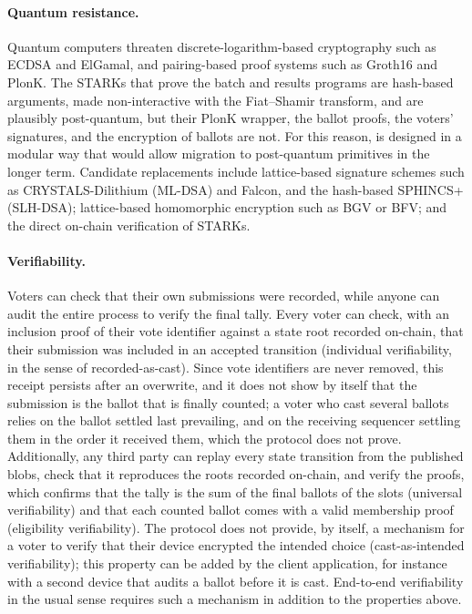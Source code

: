 \paragraph{Quantum resistance.} Quantum computers threaten discrete-logarithm-based cryptography such as ECDSA and ElGamal, and pairing-based proof systems such as Groth16 and PlonK. The \acp{STARK} that prove the batch and results programs are hash-based arguments, made non-interactive with the Fiat--Shamir transform, and are plausibly post-quantum, but their PlonK wrapper, the ballot proofs, the voters' signatures, and the encryption of ballots are not. For this reason, \davinci is designed in a modular way that would allow migration to post-quantum primitives in the longer term. Candidate replacements include lattice-based signature schemes such as CRYSTALS-Dilithium (ML-DSA) and Falcon, and the hash-based SPHINCS+ (SLH-DSA); lattice-based homomorphic encryption such as BGV or BFV; and the direct on-chain verification of \acp{STARK}.

\paragraph{Verifiability.} Voters can check that their own submissions were recorded, while anyone can audit the entire process to verify the final tally. Every voter can check, with an inclusion proof of their vote identifier against a state root recorded on-chain, that their submission was included in an accepted transition (individual verifiability, in the sense of recorded-as-cast). Since vote identifiers are never removed, this receipt persists after an overwrite, and it does not show by itself that the submission is the ballot that is finally counted; a voter who cast several ballots relies on the ballot settled last prevailing, and on the receiving sequencer settling them in the order it received them, which the protocol does not prove. Additionally, any third party can replay every state transition from the published blobs, check that it reproduces the roots recorded on-chain, and verify the proofs, which confirms that the tally is the sum of the final ballots of the slots (universal verifiability) and that each counted ballot comes with a valid membership proof (eligibility verifiability). The protocol does not provide, by itself, a mechanism for a voter to verify that their device encrypted the intended choice (cast-as-intended verifiability); this property can be added by the client application, for instance with a second device that audits a ballot before it is cast. End-to-end verifiability in the usual sense requires such a mechanism in addition to the properties above.

